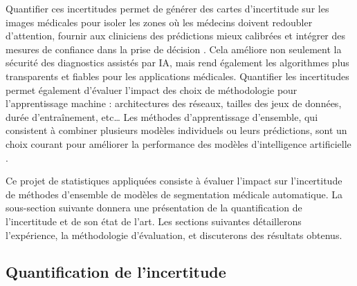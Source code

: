 \documentclass[a4paper,french,bookmarks,12pt]{article}
\begin{document}
    Quantifier ces incertitudes permet de générer des cartes d'incertitude sur les images médicales pour isoler les zones où les médecins doivent redoubler d'attention, fournir aux cliniciens des prédictions mieux calibrées et intégrer des mesures de confiance dans la prise de décision \parencite{values}. Cela améliore non seulement la sécurité des diagnostics assistés par IA, mais rend également les algorithmes plus transparents et fiables pour les applications médicales. Quantifier les incertitudes permet également d'évaluer l'impact des choix de méthodologie pour l’apprentissage machine : architectures des réseaux, tailles des jeux de données, durée d'entraînement, etc\dots{} Les méthodes d’apprentissage d'ensemble, qui consistent à combiner plusieurs modèles individuels ou leurs prédictions, sont un choix courant pour améliorer la performance des modèles d'intelligence artificielle \parencite{Ganaie_2022}. 

    Ce projet de statistiques appliquées consiste à évaluer l'impact sur l'incertitude de méthodes d'ensemble de modèles de segmentation médicale automatique. La sous-section suivante donnera une présentation de la quantification de l'incertitude et de son état de l'art. Les sections suivantes détaillerons l'expérience, la méthodologie d'évaluation, et discuterons des résultats obtenus.

    \subsection{Quantification de l'incertitude}
\end{document}
